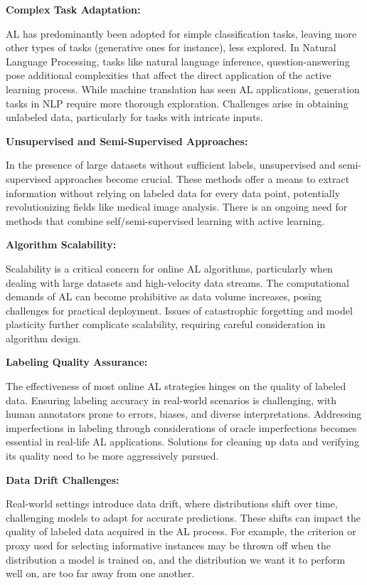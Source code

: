 \documentclass[
  letterpaper,
  numbers=noenddot,
  DIV=11]{scrreprt}
\theoremstyle{plain}
\theoremstyle{definition}
\theoremstyle{plain}
\theoremstyle{remark}
\begin{document}
\textbf{Complex Task Adaptation:}

AL has predominantly been adopted for simple classification tasks,
leaving more other types of tasks (generative ones for instance), less
explored. In Natural Language Processing, tasks like natural language
inference, question-answering pose additional complexities that affect
the direct application of the active learning process. While machine
translation has seen AL applications, generation tasks in NLP require
more thorough exploration. Challenges arise in obtaining unlabeled data,
particularly for tasks with intricate inputs.

\textbf{Unsupervised and Semi-Supervised Approaches:}

In the presence of large datasets without sufficient labels,
unsupervised and semi-supervised approaches become crucial. These
methods offer a means to extract information without relying on labeled
data for every data point, potentially revolutionizing fields like
medical image analysis. There is an ongoing need for methods that
combine self/semi-supervised learning with active learning.

\textbf{Algorithm Scalability:}

Scalability is a critical concern for online AL algorithms, particularly
when dealing with large datasets and high-velocity data streams. The
computational demands of AL can become prohibitive as data volume
increases, posing challenges for practical deployment. Issues of
catastrophic forgetting and model plasticity further complicate
scalability, requiring careful consideration in algorithm design.

\textbf{Labeling Quality Assurance:}

The effectiveness of most online AL strategies hinges on the quality of
labeled data. Ensuring labeling accuracy in real-world scenarios is
challenging, with human annotators prone to errors, biases, and diverse
interpretations. Addressing imperfections in labeling through
considerations of oracle imperfections becomes essential in real-life AL
applications. Solutions for cleaning up data and verifying its quality
need to be more aggressively pursued.

\textbf{Data Drift Challenges:}

Real-world settings introduce data drift, where distributions shift over
time, challenging models to adapt for accurate predictions. These shifts
can impact the quality of labeled data acquired in the AL process. For
example, the criterion or proxy used for selecting informative instances
may be thrown off when the distribution a model is trained on, and the
distribution we want it to perform well on, are too far away from one
another.
\end{document}
